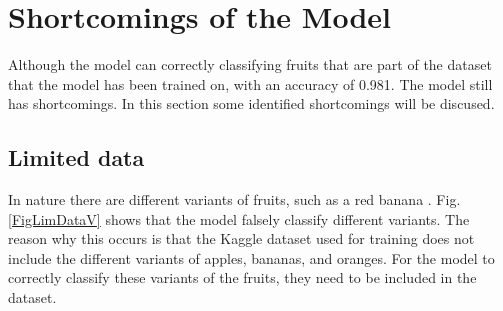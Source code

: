 \documentclass[conference]{IEEEtran}
\begin{document}
\section{Shortcomings of the Model}

Although the model can correctly classifying fruits that are part of the dataset that the model has been trained on, with an accuracy of 0.981. The model still has shortcomings. In this section some identified shortcomings will be discused. 

\subsection{Limited data}

In nature there are different variants of fruits, such as a red banana \cite{b18}. Fig. \ref{FigLimDataV} shows that the model falsely classify different variants. The reason why this occurs is that the Kaggle dataset used for training does not include the different variants of apples, bananas, and oranges. For the model to correctly classify these variants of the fruits, they need to be included in the dataset.
\end{document}
